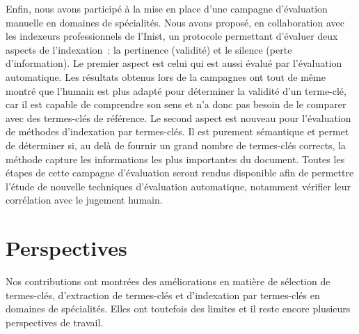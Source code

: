     Enfin, nous avons participé à la mise en place d'une campagne d'évaluation
    manuelle en domaines de spécialités. Nous avons proposé, en collaboration
    avec les indexeurs professionnels de l'Inist, un protocole permettant
    d'évaluer deux aspects de l'indexation~: la pertinence (validité) et le
    silence (perte d'information). Le premier aspect est celui qui est aussi
    évalué par l'évaluation automatique. Les résultats obtenus lors de la
    campagnes ont tout de même montré que l'humain est plus adapté pour
    déterminer la validité d'un terme-clé, car il est capable de comprendre son
    sens et n'a donc pas besoin de le comparer avec des termes-clés de
    référence. Le second aspect est nouveau pour l'évaluation de méthodes
    d'indexation par termes-clés. Il est purement sémantique et permet de
    déterminer si, au delà de fournir un grand nombre de termes-clés corrects,
    la méthode capture les informations les plus importantes du document. Toutes
    les étapes de cette campagne d'évaluation seront rendus disponible afin de
    permettre l'étude de nouvelle techniques d'évaluation automatique, notamment
    vérifier leur corrélation avec le jugement humain.

  \section{Perspectives}
  \label{sec:main-conclusion-contributions}
    Nos contributions ont montrées des améliorations en matière de sélection de
    termes-clés, d'extraction de termes-clés et d'indexation par termes-clés en
    domaines de spécialités. Elles ont toutefois des limites et il reste encore
    plusieurs perspectives de travail.

